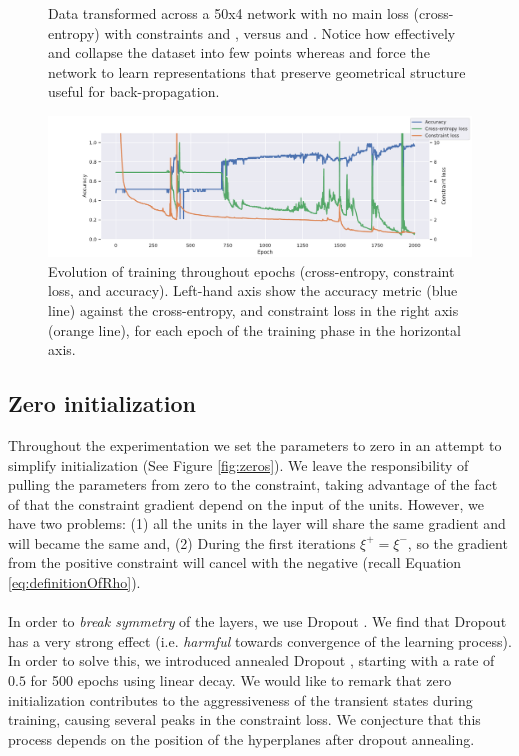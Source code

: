 \begin{figure}
  \caption{Data transformed across a 50x4 network with no main loss (cross-entropy) with constraints \SepLayer and \SepUnitPoint, versus \ReLU and \ReLUBN. Notice how effectively \ReLU and \ReLUBN collapse the dataset into few points whereas \SepLayer and \SepUnitPoint force the network to learn representations that preserve geometrical structure useful for back-propagation.} 
  \label{fig:init} 
\end{figure}





\begin{figure}[h]
  \begin{center}
    \includegraphics[width=1.0\textwidth]{peaks}
      \caption{Evolution of training throughout epochs (cross-entropy, constraint loss, and accuracy). Left-hand axis show the accuracy metric (blue line) against the cross-entropy, and constraint loss in the right axis (orange line), for each epoch of the training phase in the horizontal axis.}
			\label{fig:peaks}
\end{center}
\end{figure}





\subsection{Zero initialization}\label{subsec:zero}

Throughout the experimentation we set the parameters to zero in an attempt to simplify initialization (See Figure \ref{fig:zeros}). We leave the responsibility of pulling the parameters from zero to the constraint, taking advantage of the fact of that the constraint gradient depend on the input of the units. However, we have two problems: (1) all the units in the layer will share the same gradient and will became the same and, (2) During the first iterations $\xi^+ = \xi^-$, so the gradient from the positive constraint will cancel with the negative (recall Equation \ref{eq:definitionOfRho}).
\\\\
In order to \emph{break symmetry} of the layers, we use Dropout \cite{dropout}. We find that Dropout has a very strong effect (i.e. \emph{harmful} towards convergence of the learning process). In order to solve this, we introduced annealed Dropout \cite{dropoutAnnealing}, starting with a rate of $0.5$ for 500 epochs using linear decay. We would like to remark that zero initialization  contributes to the aggressiveness of the transient states during training, causing  several peaks in the constraint loss. We conjecture that this process depends on the position of the hyperplanes after dropout annealing. 

